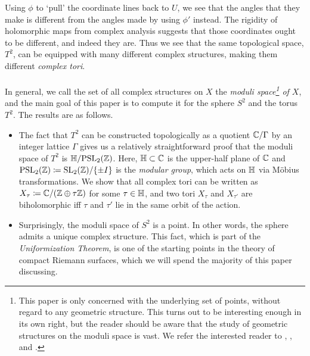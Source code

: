 \documentclass[../Moduli_Spaces_of_Riemann_Surfaces.tex]{subfiles}
\begin{document}
    Using $\phi$ to `pull' the coordinate lines back to $U$, we see that the angles that they make is different from the angles made by using $\phi'$ instead. The rigidity of holomorphic maps from complex analysis suggests that those coordinates ought to be different, and indeed they are. Thus we see that the same topological space, $T^2$, can be equipped with many different complex structures, making them different \textit{complex tori}.\\\ \\
    In general, we call the set of all complex structures on $X$ the \textit{moduli space\footnote{This paper is only concerned with the underlying set of points, without regard to any geometric structure. This turns out to be interesting enough in its own right, but the reader should be aware that the study of geometric structures on the moduli space is vast. We refer the interested reader to \cite{i&t}, \cite{farb}, and \cite{hubbard}.} of $X$}, and the main goal of this paper is to compute it for the sphere $S^2$ and the torus $T^2$. The results are as follows.
    \begin{itemize}
        \item The fact that $T^2$ can be constructed topologically as a quotient $\mathbb{C}/\Gamma$ by an integer lattice $\Gamma$ gives us a relatively straightforward proof that the moduli space of $T^2$ is $\mathbb{H}/\!\operatorname{PSL}_{2}\!\left(\mathbb{Z}\right)$. Here, $\mathbb{H}\subset\mathbb{C}$ is the upper-half plane of $\mathbb{C}$ and $\operatorname{PSL}_{2}\!\left(\mathbb{Z}\right)\coloneqq\operatorname{SL}_2\!\left(\mathbb{Z}\right)\!/\!\left\{\pm I\right\}$ is the \textit{modular group}, which acts on $\mathbb{H}$ via Möbius transformations. We show that all complex tori can be written as $X_\tau\coloneqq\mathbb{C}/\!\left(\mathbb{Z}\oplus\tau\mathbb{Z}\right)$ for some $\tau\in\mathbb{H}$, and two tori $X_\tau$ and $X_{\tau'}$ are biholomorphic iff $\tau$ and $\tau'$ lie in the same orbit of the action.
            \vspace{-0.05in}
        \item Surprisingly, the moduli space of $S^2$ is a point. In other words, the sphere admits a unique complex structure. This fact, which is part of the \textit{Uniformization Theorem}, is one of the starting points in the theory of compact Riemann surfaces, which we will spend the majority of this paper discussing.
    \end{itemize}
\end{document}
